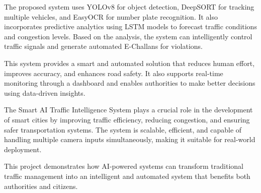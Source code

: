 \documentclass[12,Times new Roman,a4paper]{report}
\begin{document}
The proposed system uses YOLOv8 for object detection, DeepSORT for tracking multiple vehicles, and EasyOCR for number plate recognition. It also incorporates predictive analytics using LSTM models to forecast traffic conditions and congestion levels. Based on the analysis, the system can intelligently control traffic signals and generate automated E-Challans for violations.

This system provides a smart and automated solution that reduces human effort, improves accuracy, and enhances road safety. It also supports real-time monitoring through a dashboard and enables authorities to make better decisions using data-driven insights.

The Smart AI Traffic Intelligence System plays a crucial role in the development of smart cities by improving traffic efficiency, reducing congestion, and ensuring safer transportation systems. The system is scalable, efficient, and capable of handling multiple camera inputs simultaneously, making it suitable for real-world deployment.

This project demonstrates how AI-powered systems can transform traditional traffic management into an intelligent and automated system that benefits both authorities and citizens.
\end{document}
